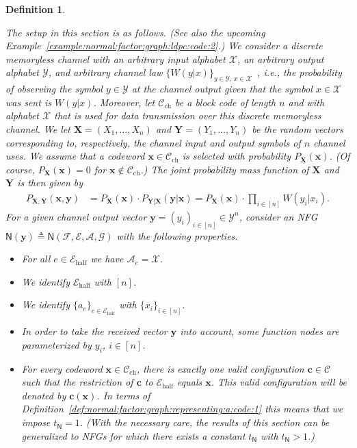 \documentclass[journal, twocolumn]{IEEEtran}
\renewcommand{\mathbf}[1]{{\bm{#1}}}
\newcommand{\ie}{\emph{i.e.}}
\newcommand{\vect}[1]{\mathbf{#1}}
\newcommand{\code}[1]{\mathcal{#1}}
\newcommand{\set}[1]{\mathcal{#1}}
\newcommand{\graph}[1]{\mathsf{#1}}
\newcommand{\defeq}{\triangleq}
\newcommand{\codeCchannel}{\code{C}_{\mathrm{ch}}}
\newcommand{\codeCedge}{\code{C}}
\newcommand{\setA}{\set{A}}
\newcommand{\setE}{\set{E}}
\newcommand{\setEhalf}{\set{E}_{\mathrm{half}}}
\newcommand{\setF}{\set{F}}
\newcommand{\setG}{\set{G}}
\newcommand{\setX}{\set{X}}
\newcommand{\setY}{\set{Y}}
\newcommand{\vc}{\vect{c}}
\newcommand{\vX}{\vect{X}}
\newcommand{\vx}{\vect{x}}
\newcommand{\vY}{\vect{Y}}
\newcommand{\vy}{\vect{y}}
\newcommand{\graphN}{\graph{N}}
\newcommand{\?}{\mathrm{?}}
\newtheorem{Definition}[Lemma]{Definition}
\begin{document}
\begin{Definition}
  \label{def:coding:normal:factor:graph:1}

  The setup in this section is as follows. (See also the upcoming
  Example~\ref{example:normal:factor:graph:ldpc:code:2}.) We consider a
  discrete memoryless channel with an arbitrary input alphabet $\setX$, an
  arbitrary output alphabet $\setY$, and arbitrary channel law $\bigl\{ W(y|x)
  \bigr\}_{y \in \setY, \, x \in \setX}$~\!, \ie, the probability of observing
  the symbol $y \in \setY$ at the channel output given that the symbol $x \in
  \setX$ was sent is $W(y|x)$. Moreover, let $\codeCchannel$ be a block code
  of length $n$ and with alphabet $\setX$ that is used for data transmission
  over this discrete memoryless channel. We let $\vX = (X_1, \ldots, X_n)$ and
  $\vY = (Y_1, \ldots, Y_n)$ be the random vectors corresponding to,
  respectively, the channel input and output symbols of $n$ channel uses. We
  assume that a codeword $\vx \in \codeCchannel$ is selected with probability
  $P_{\vX}(\vx)$. (Of course, $P_{\vX}(\vx) = 0$ for $\vx \notin
  \codeCchannel$.) The joint probability mass function of $\vX$ and $\vY$ is
  then given by
  \begin{align*}
    P_{\vX, \vY}(\vx, \vy)
     &= P_{\vX}(\vx)
        \! \cdot \!
        P_{\vY|\vX}(\vy | \vx)
      = P_{\vX}(\vx)
        \cdot
        \!\! \prod_{i \in [n]} \!\!
          W(y_i | x_i).
  \end{align*}
  For a given channel output vector $\vy = (y_i)_{i \in [n]} \in \setY^n$,
  consider an NFG $\graphN(\vy) \defeq \graphN(\setF,\setE, \setA, \setG)$
  with the following properties.
  \begin{itemize}

  \item For all $e \in \setEhalf$ we have $\setA_e = \setX$.

  \item We identify $\setEhalf$ with $[n]$.

  \item We identify $\{ a_e \}_{e \in \setEhalf}$ with $\{ x_i \}_{i \in
      [n]}$.

  \item In order to take the received vector $\vy$ into account, some function
    nodes are parameterized by $y_i$, $i \in [n]$.

  
  \item For every codeword $\vx \in \codeCchannel$, there is exactly one valid
    configuration $\vc \in \codeCedge$ such that the restriction of $\vc$ to
    $\setEhalf$ equals $\vx$. This valid configuration will be denoted by
    $\vc(\vx)$. In terms of
    Definition~\ref{def:normal:factor:graph:representing:a:code:1} this means
    that we impose $t_{\graphN} = 1$. (With the necessary care, the results of
    this section can be generalized to NFGs for which there exists a constant
    $t_{\graphN}$ with $t_{\graphN} > 1$.)
 

\end{itemize}
\end{Definition}
\end{document}

